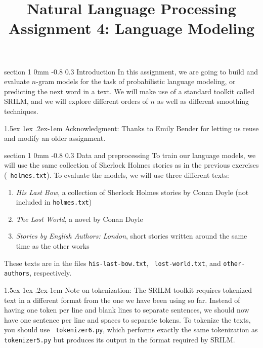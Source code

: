 \documentclass[11pt]{article}
\title{{\LARGE Natural Language Processing}\\[1.5mm]{\large Assignment 4: Language Modeling}}
\author{}
\date{} %
\makeatletter
\newcommand{\newsec}[2]{\section{#1}\label{sec:#2}\noindent}
\renewcommand{\section}{\@startsection
{section}%
{1}%
{0mm}%
{-0.8\baselineskip}%
{0.3\baselineskip}%
{\bfseries\large}}%
\renewcommand{\paragraph}{%
  \@startsection{paragraph}{4}%
  {\z@}{1.5ex \@plus 1ex \@minus .2ex}{-1em}%
  {\normalfont\normalsize\bfseries}%
}\makeatother
\makeatother
\begin{document}
 

\maketitle
\vspace{-2mm}
\newsec{Introduction}{intro}%
In this assignment, we are going to build and evaluate $n$-gram models %
for the task of probabilistic language modeling, or predicting the next word in a text. We will make use
of a standard toolkit called SRILM, and we will explore different orders of $n$ as well as different smoothing techniques. 

\paragraph{Acknowledgment:} Thanks to Emily Bender for letting us reuse
and modify an older assignment.

\newsec{Data and preprocessing}{data}%
To train our language models, we will use the same collection of
Sherlock Holmes stories as in the previous exercises ({\tt
  holmes.txt}).  To evaluate the models, we will use three different
texts:
\begin{enumerate}[noitemsep,topsep=0.2cm]
\item \emph{His Last Bow}, a collection of Sherlock Holmes stories by
  Conan Doyle (not included in {\tt holmes.txt})
\item \emph{The Lost World}, a novel by Conan Doyle
\item \emph{Stories by English Authors: London}, short stories written
  around the same time as the other works
\end{enumerate}
These texts are in the files {\tt his-last-bow.txt}, {\tt
  lost-world.txt}, and {\tt other-authors}, respectively.

\paragraph{Note on tokenization:} The SRILM toolkit requires tokenized
text in a different format from the one we have been using so far.
Instead of having one token per line and blank lines to separate
sentences, we should now have one sentence per line and spaces to
separate tokens.  To tokenize the texts, you should use {\tt
  tokenizer6.py}, which performs exactly the same tokenization as {\tt
  tokenizer5.py} but produces its output in the format required by
SRILM.
\end{document}
